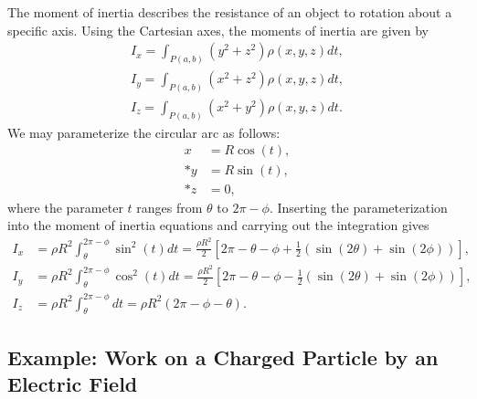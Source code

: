 The moment of inertia describes the resistance of an object to rotation about a specific axis. Using the Cartesian axes, the moments of inertia are given by
\begin{subequations}
\begin{align}
  I_x = \int_{P(a,b)} ( y^2 + z^2 ) \rho(x,y,z) dt, \\
  I_y = \int_{P(a,b)} ( x^2 + z^2 ) \rho(x,y,z) dt, \\
  I_z = \int_{P(a,b)} ( x^2 + y^2 ) \rho(x,y,z) dt .
\end{align}
\end{subequations}
We may parameterize the circular arc as follows:
\begin{subequations}
\begin{align}
  x &= R \cos(t), \\*
  y &= R \sin(t), \\*
  z &= 0,
\end{align}
\end{subequations}
where the parameter $t$ ranges from $\theta$ to $2\pi - \phi$.  Inserting the parameterization into the moment of inertia equations and carrying out the integration gives
\begin{subequations}
\begin{align}
  I_x &= \rho R^2 \int_\theta^{2\pi - \phi} \sin^2(t) dt = \frac{\rho R^2}{2} \left[ 2\pi - \theta - \phi + \frac{1}{2} \left( \sin(2\theta) + \sin(2\phi) \right) \right], \\
  I_y &= \rho R^2 \int_\theta^{2\pi - \phi} \cos^2(t) dt = \frac{\rho R^2}{2} \left[ 2\pi - \theta - \phi - \frac{1}{2} \left( \sin(2\theta) + \sin(2\phi) \right) \right], \\
  I_z &= \rho R^2 \int_\theta^{2\pi - \phi} dt = \rho R^2 ( 2 \pi - \phi - \theta ).
\end{align}
\end{subequations}

\subsection{Example: Work on a Charged Particle by an Electric Field}

